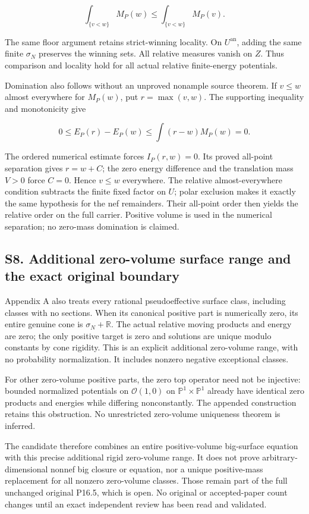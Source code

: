 \documentclass[
  10pt,
]{article}
\begin{document}
\[\int_{\{v<w\}}M_P(w)\leq\int_{\{v<w\}}M_P(v).\]

The same floor argument retains strict-winning locality. On
\(U^{\mathrm{an}}\), adding the same finite \(\sigma_N\) preserves the
winning sets. All relative measures vanish on \(Z\). Thus comparison and
locality hold for all actual relative finite-energy potentials.

Domination also follows without an unproved nonample source theorem. If
\(v\leq w\) almost everywhere for \(M_P(w)\), put \(r=\max(v,w)\). The
supporting inequality and monotonicity give

\[0\leq E_P(r)-E_P(w)\leq\int(r-w)M_P(w)=0.\]

The ordered numerical estimate forces \(I_P(r,w)=0\). Its proved
all-point separation gives \(r=w+C\); the zero energy difference and the
translation mass \(V>0\) force \(C=0\). Hence \(v\leq w\) everywhere.
The relative almost-everywhere condition subtracts the finite fixed
factor on \(U\); polar exclusion makes it exactly the same hypothesis
for the nef remainders. Their all-point order then yields the relative
order on the full carrier. Positive volume is used in the numerical
separation; no zero-mass domination is claimed.

\subsection{S8. Additional zero-volume surface range and the exact
original
boundary}\label{s8.-additional-zero-volume-surface-range-and-the-exact-original-boundary}

Appendix A also treats every rational pseudoeffective surface class,
including classes with no sections. When its canonical positive part is
numerically zero, its entire genuine cone is \(\sigma_N+\mathbb R\). The
actual relative moving products and energy are zero; the only positive
target is zero and solutions are unique modulo constants by cone
rigidity. This is an explicit additional zero-volume range, with no
probability normalization. It includes nonzero negative exceptional
classes.

For other zero-volume positive parts, the zero top operator need not be
injective: bounded normalized potentials on \(\mathcal O(1,0)\) on
\(\mathbb P^1\times\mathbb P^1\) already have identical zero products
and energies while differing nonconstantly. The appended construction
retains this obstruction. No unrestricted zero-volume uniqueness theorem
is inferred.

The candidate therefore combines an entire positive-volume big-surface
equation with this precise additional rigid zero-volume range. It does
not prove arbitrary-dimensional nonnef big closure or equation, nor a
unique positive-mass replacement for all nonzero zero-volume classes.
Those remain part of the full unchanged original P16.5, which is open.
No original or accepted-paper count changes until an exact independent
review has been read and validated.
\end{document}
